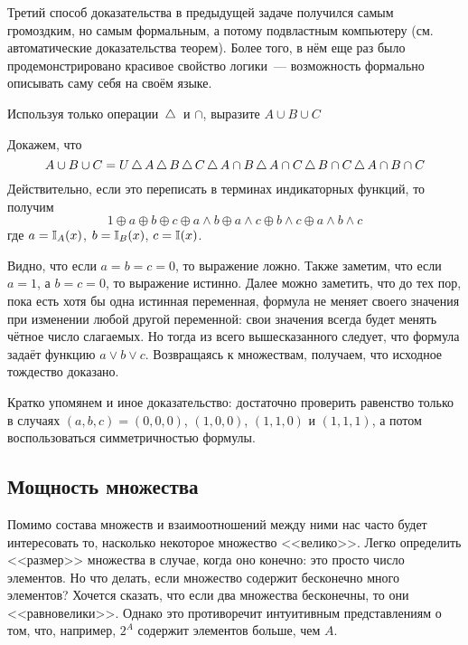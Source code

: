 Третий способ доказательства в предыдущей задаче получился самым громоздким, но самым формальным,
а потому подвластным компьютеру (см. автоматические доказательства теорем).
Более того, в нём еще раз было продемонстрировано красивое свойство логики~---
возможность формально описывать саму себя на своём языке.

\begin{Exercise}[counter=SecExercise]
    \noindent
    Используя только операции $ \,\triangle\, $ и $ \cap $, выразите $ A \cup B \cup C $
\end{Exercise}

\begin{Answer}
    \noindent
    Докажем, что
    \[
        A \cup B \cup C = U \,\triangle\, A \,\triangle\, B \,\triangle\, C \,\triangle\, A \cap B \,\triangle\, A \cap C \,\triangle\, B \cap C \,\triangle\, A \cap B \cap C
    \]
    Действительно, если это переписать в терминах индикаторных функций, то получим
    \[
        1 \oplus a \oplus b \oplus c \oplus a \wedge b \oplus a \wedge c \oplus b \wedge c \oplus a \wedge b \wedge c
    \]
    где $ a = \mathbb{I}_A(x) $, $ b = \mathbb{I}_B(x) $, $ c = \mathbb{I}(x) $.

    Видно, что если $ a = b = c = 0 $, то выражение ложно.
    Также заметим, что если $ a = 1 $, а $ b = c = 0 $, то выражение истинно.
    Далее можно заметить, что до тех пор, пока есть хотя бы одна истинная переменная, формула не меняет своего значения при изменении любой другой переменной:
    свои значения всегда будет менять чётное число слагаемых.
    Но тогда из всего вышесказанного следует, что формула задаёт функцию $ a \vee b \vee c $.
    Возвращаясь к множествам, получаем, что исходное тождество доказано.

    Кратко упомянем и иное доказательство: достаточно проверить равенство только в случаях $ (a,b,c) = (0,0,0) $, $ (1,0,0) $, $ (1,1,0) $ и $ (1,1,1) $, а потом воспользоваться симметричностью формулы.
\end{Answer}


\iffalse
\subsection{Мощность множества}
\label{subsec:sets:cardinality}

Помимо состава множеств и взаимоотношений между ними нас часто будет интересовать то, насколько некоторое множество <<велико>>.
Легко определить <<размер>> множества в случае, когда оно конечно: это просто число элементов.
Но что делать, если множество содержит бесконечно много элементов?
Хочется сказать, что если два множества бесконечны, то они <<равновелики>>.
Однако это противоречит интуитивным представлениям о том, что, например, $ 2^A $ содержит элементов больше, чем $ A $.

